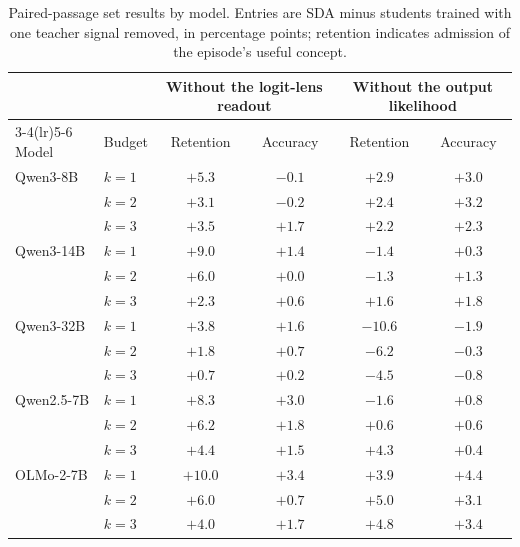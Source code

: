 \begin{table}[t]
\centering
\caption{Paired-passage set results by model. Entries are SDA minus students trained with one teacher
signal removed, in percentage points; retention indicates admission of the episode's useful concept.}
\label{tab:crosspairmodels}
\footnotesize
\setlength{\tabcolsep}{2pt}
\begin{tabular}{llcccc}
\toprule
& & \multicolumn{2}{c}{Without the logit-lens readout} & \multicolumn{2}{c}{Without the output likelihood} \\
\cmidrule(lr){3-4}\cmidrule(lr){5-6}
Model & Budget & Retention & Accuracy & Retention & Accuracy \\
\midrule
Qwen3-8B & $k=1$ & $+5.3$ & $-0.1$ & $+2.9$ & $+3.0$ \\
 & $k=2$ & $+3.1$ & $-0.2$ & $+2.4$ & $+3.2$ \\
 & $k=3$ & $+3.5$ & $+1.7$ & $+2.2$ & $+2.3$ \\
\addlinespace
Qwen3-14B & $k=1$ & $+9.0$ & $+1.4$ & $-1.4$ & $+0.3$ \\
 & $k=2$ & $+6.0$ & $+0.0$ & $-1.3$ & $+1.3$ \\
 & $k=3$ & $+2.3$ & $+0.6$ & $+1.6$ & $+1.8$ \\
\addlinespace
Qwen3-32B & $k=1$ & $+3.8$ & $+1.6$ & $-10.6$ & $-1.9$ \\
 & $k=2$ & $+1.8$ & $+0.7$ & $-6.2$ & $-0.3$ \\
 & $k=3$ & $+0.7$ & $+0.2$ & $-4.5$ & $-0.8$ \\
\addlinespace
Qwen2.5-7B & $k=1$ & $+8.3$ & $+3.0$ & $-1.6$ & $+0.8$ \\
 & $k=2$ & $+6.2$ & $+1.8$ & $+0.6$ & $+0.6$ \\
 & $k=3$ & $+4.4$ & $+1.5$ & $+4.3$ & $+0.4$ \\
\addlinespace
OLMo-2-7B & $k=1$ & $+10.0$ & $+3.4$ & $+3.9$ & $+4.4$ \\
 & $k=2$ & $+6.0$ & $+0.7$ & $+5.0$ & $+3.1$ \\
 & $k=3$ & $+4.0$ & $+1.7$ & $+4.8$ & $+3.4$ \\
\bottomrule
\end{tabular}
\end{table}

